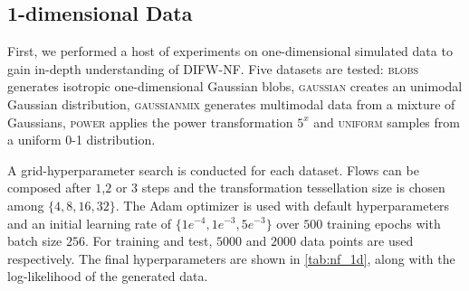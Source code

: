 \subsection{1-dimensional Data}

First, we performed a host of experiments on one-dimensional simulated data to gain in-depth understanding of DIFW-NF. Five datasets are tested: 
\textsc{blobs} generates isotropic one-dimensional Gaussian blobs,
\textsc{gaussian} creates an unimodal Gaussian distribution,
\textsc{gaussianmix} generates multimodal data from a mixture of Gaussians,
\textsc{power} applies the power transformation $5^x$
and \textsc{uniform} samples from a uniform 0-1 distribution. 




A grid-hyperparameter search is conducted for each dataset. 
Flows can be composed after $1$,$2$ or $3$ steps and the transformation tessellation size is chosen among $\{4,8,16,32\}$.
The Adam optimizer \cite{kingma2014adam} is used with default hyperparameters and an initial learning rate of $\{1e^{-4}, 1e^{-3}, 5e^{-3}\}$ over $500$ training epochs with batch size $256$. For training and test, $5000$ and $2000$ data points are used respectively. 
The final hyperparameters are shown in \cref{tab:nf_1d}, along with the log-likelihood of the generated data.



